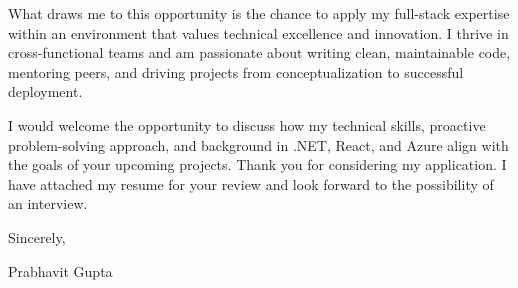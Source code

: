 \documentclass[11pt,a4paper]{article}
\begin{document}
\noindent What draws me to this opportunity is the chance to apply my full-stack expertise within an environment that values technical excellence and innovation. I thrive in cross-functional teams and am passionate about writing clean, maintainable code, mentoring peers, and driving projects from conceptualization to successful deployment.

\vspace{1em}

\noindent I would welcome the opportunity to discuss how my technical skills, proactive problem-solving approach, and background in .NET, React, and Azure align with the goals of your upcoming projects. Thank you for considering my application. I have attached my resume for your review and look forward to the possibility of an interview.

\vspace{2em}

\noindent Sincerely,

\vspace{1em}

\noindent Prabhavit Gupta
\end{document}
